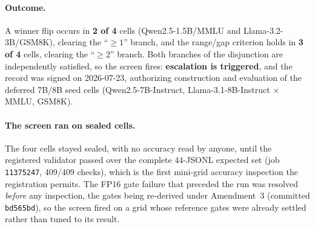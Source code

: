 \paragraph{Outcome.}
A winner flip occurs in \textbf{2 of 4} cells (Qwen2.5-1.5B/MMLU and
Llama-3.2-3B/GSM8K), clearing the ``$\geq 1$'' branch, and the range/gap
criterion holds in \textbf{3 of 4} cells, clearing the ``$\geq 2$'' branch. Both
branches of the disjunction are independently satisfied, so the screen fires:
\textbf{escalation is triggered}, and the record was signed on 2026-07-23,
authorizing construction and evaluation of the deferred 7B/8B seed cells
(Qwen2.5-7B-Instruct, Llama-3.1-8B-Instruct $\times$ MMLU, GSM8K).

\paragraph{The screen ran on sealed cells.}
The four cells stayed sealed, with no accuracy read by anyone, until the registered
validator passed over the complete 44-JSONL expected set (job \texttt{11375247},
409/409 checks), which is the first mini-grid accuracy inspection the
registration permits. The FP16 gate failure that preceded the run was resolved
\emph{before} any inspection, the gates being re-derived under Amendment~3
(committed \texttt{bd565bd}), so the screen fired on a grid whose reference
gates were already settled rather than tuned to its result.

